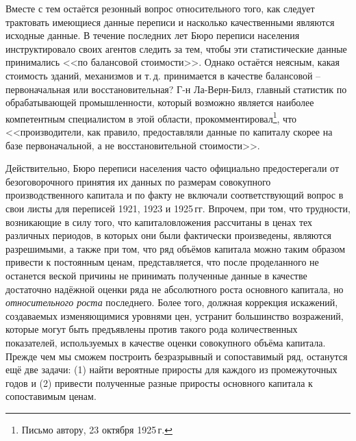 \documentclass[leqno]{article}  %
\begin{document}
\par
Вместе с тем остаётся резонный вопрос относительного того, как следует трактовать имеющиеся данные переписи и насколько качественными являются исходные данные. В течение последних лет Бюро переписи населения инструктировало своих агентов следить за тем, чтобы эти статистические данные принимались <<по балансовой стоимости>>. Однако остаётся неясным, какая стоимость зданий, механизмов и т.\,д. принимается в качестве балансовой -- первоначальная или восстановительная? Г-н Ла-Верн-Билз, главный статистик по обрабатывающей промышленности, который возможно является наиболее компетентным специалистом в этой области, прокомментировал\footnote{Письмо автору, 23 октября 1925\,г.}, что <<производители, как правило, предоставляли данные по капиталу скорее на базе первоначальной, а не восстановительной стоимости>>.
\par
Действительно, Бюро переписи населения часто официально предостерегали от безоговорочного принятия их данных по размерам совокупного производственного капитала и по факту не включали соответствующий вопрос в свои листы для переписей 1921, 1923 и 1925\,гг. Впрочем, при том, что трудности, возникающие в силу того, что капиталовложения рассчитаны в ценах тех различных периодов, в которых они были фактически произведены, являются разрешимыми, а также при том, что ряд объёмов капитала можно таким образом привести к постоянным ценам, представляется, что после проделанного не останется веской причины не принимать полученные данные в качестве достаточно надёжной оценки ряда не абсолютного роста основного капитала, но \emph{относительного роста} последнего. Более того, должная коррекция искажений, создаваемых изменяющимися уровнями цен, устранит большинство возражений, которые могут быть предъявлены против такого рода количественных показателей, используемых в качестве оценки совокупного объёма капитала. Прежде чем мы сможем построить безразрывный и сопоставимый ряд, останутся ещё две задачи: (1) найти вероятные приросты для каждого из промежуточных годов и (2) привести полученные разные приросты основного капитала к сопоставимым ценам.
\par
\end{document}
